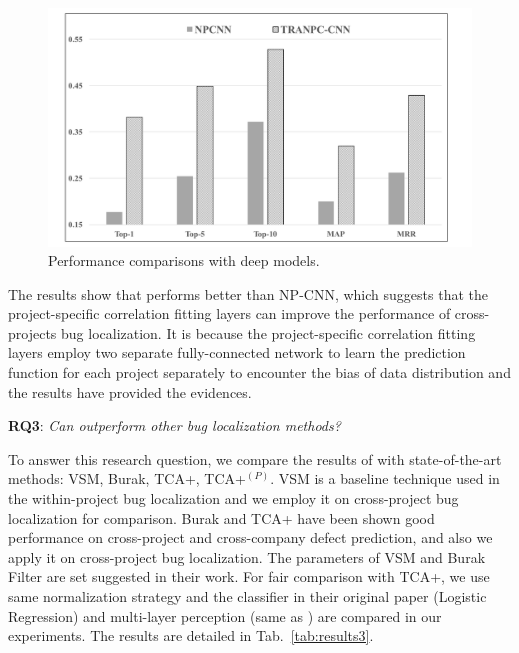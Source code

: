 \begin{figure}[hbt]
\centering
\includegraphics[width = 0.9\columnwidth]{pic/results2_avg.pdf}
\caption{Performance comparisons with deep models.}
\label{fig:results2}
\end{figure}

The results show that \TRANPCNN performs better than NP-CNN, which suggests that the project-specific correlation fitting layers  can improve the performance of cross-projects bug localization. It is because the project-specific correlation fitting layers employ two separate fully-connected network to learn the prediction function for each project separately to encounter the bias of data distribution and the results have provided the evidences.  

\textbf{RQ3}: \textit{Can \TRANPCNN outperform other bug localization methods?}

To answer this research question, we compare the results of \TRANPCNN with state-of-the-art methods: VSM, Burak, TCA+, TCA+$^(P)$. VSM is a baseline technique used in the within-project bug localization and we employ it on cross-project bug localization for comparison. Burak and TCA+ have been shown good performance on cross-project and cross-company defect prediction, and also we apply it on cross-project bug localization. The parameters of VSM and Burak Filter are set suggested in their work. For fair comparison with TCA+, we use same normalization strategy and the classifier in their original paper (Logistic Regression) and multi-layer perception (same as \TRANPCNN) are compared in our experiments. The results are detailed in Tab.~\ref{tab:results3}. 


